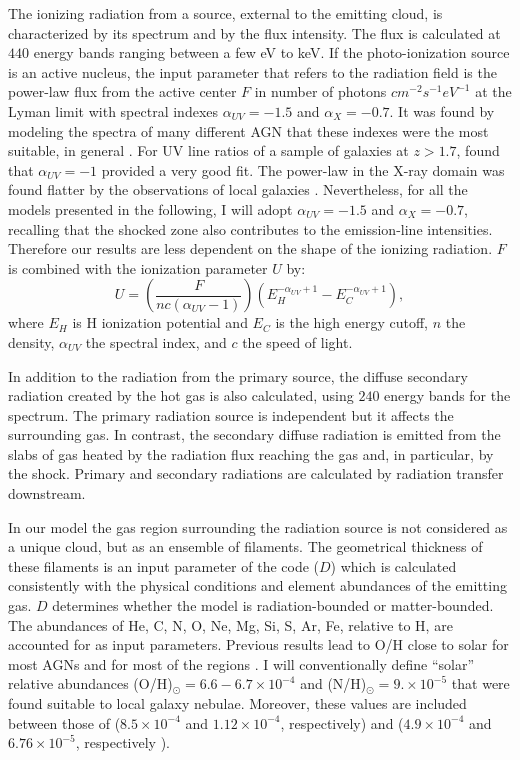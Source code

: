 \documentclass[../main.tex]{subfiles}
\begin{document}
The ionizing radiation from a source, external to the emitting cloud, is characterized by its spectrum and by the flux intensity. 
The flux is calculated at $440$ energy bands ranging between a few eV to keV.
If the photo-ionization source is an active nucleus, the input parameter that refers to the radiation field is the power-law flux  from the active center $F$ in number of photons $\si{cm^{-2} s^{-1} eV^{-1}}$ at the Lyman limit with spectral indexes  $\alpha_{UV}=-1.5$ and $\alpha_X=-0.7$.
It was found by modeling the spectra of many different AGN that these indexes were the most suitable, in general \citep[see, e.g.][ and references therein]{Contini83,Aldrovandi84,Rodriguez05}.
For UV line ratios of a sample of galaxies at $z> 1.7$, \citet{Villar97} found that $\alpha_{UV}=-1$ provided a very good fit.
The power-law in the X-ray domain was found flatter by the observations of local galaxies \citep[$\alpha_X=-1$, e.g.][]{Crenshaw02,Turner01}.
Nevertheless, for all the models presented in the following, I will adopt $\alpha_{UV}=-1.5$ and $\alpha_{X} = -0.7$, recalling that the shocked zone also contributes to the emission-line intensities.  
Therefore our results are less dependent on the shape of the ionizing radiation.
$F$ is combined with the ionization parameter $U$ by: 
\begin{equation}
\label{eq:Umarc}
U= \left(\frac{F}{n c (\alpha_{UV} -1)}\right) \left(E_H^{-\alpha_{UV} +1} - E_C^{-\alpha_{UV} +1}\right),
\end{equation}
where $E_H$ is H ionization potential  and $E_C$ is the high energy cutoff, $n$ the density, $\alpha_{UV}$ the spectral index, and $c$ the speed of light.

In addition to the radiation from the primary source, the diffuse secondary radiation created by the hot gas is also calculated, using $240$ energy bands for the spectrum.
The primary radiation source is independent but it affects the surrounding gas.
In contrast, the secondary diffuse radiation is emitted from the slabs of gas heated by the radiation flux reaching the gas and, in particular, by the shock.
Primary and secondary radiations are calculated by radiation transfer downstream.

In our model the gas region surrounding the radiation source is not considered as a unique cloud, but as an ensemble of filaments. 
The geometrical thickness of these filaments is an input parameter of the code ($D$) which is calculated consistently with the physical conditions and element abundances of the emitting gas.
$D$ determines whether the model is radiation-bounded or matter-bounded.
The abundances of He, C, N, O, Ne, Mg, Si, S, Ar, Fe, relative to H, are accounted for as input parameters. 
Previous results lead to O/H close to solar for most AGNs and for most of the  regions \citep[e.g.][]{Contini17}.
I will conventionally define ``solar''  relative abundances (O/H)$_{\odot }=6.6 - 6.7 \times10^{-4}$ and (N/H)$_{\odot }= 9.\times10^{-5}$ \citep{Allen76,Grevesse98} that were found suitable to local galaxy nebulae. 
Moreover, these values are included between those of \citet{Anders89} ($8.5\times10^{-4}$ and $1.12\times10^{-4}$, respectively) and \citet{Asplund09} ($4.9\times10^{-4}$ and $6.76\times10^{-5}$, respectively ).
\end{document}
